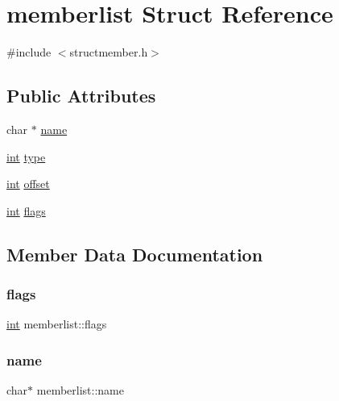 \hypertarget{structmemberlist}{}\section{memberlist Struct Reference}
\label{structmemberlist}


{\ttfamily \#include $<$structmember.\+h$>$}

\subsection*{Public Attributes}
\begin{DoxyCompactItemize}
\item 
char $\ast$ \mbox{\hyperlink{structmemberlist_a75c543af2144964e75d5e3a52e454d68}{name}}
\item 
\mbox{\hyperlink{warnings_8h_a74f207b5aa4ba51c3a2ad59b219a423b}{int}} \mbox{\hyperlink{structmemberlist_a03754cfbc59d653366c4165d2682d485}{type}}
\item 
\mbox{\hyperlink{warnings_8h_a74f207b5aa4ba51c3a2ad59b219a423b}{int}} \mbox{\hyperlink{structmemberlist_a55dfff380cf83407e78a6bb7913f5d7d}{offset}}
\item 
\mbox{\hyperlink{warnings_8h_a74f207b5aa4ba51c3a2ad59b219a423b}{int}} \mbox{\hyperlink{structmemberlist_accf2b50aef69d800ebf983a002a18638}{flags}}
\end{DoxyCompactItemize}


\subsection{Member Data Documentation}
\mbox{\label{structmemberlist_accf2b50aef69d800ebf983a002a18638}} 
\subsubsection{\texorpdfstring{flags}{flags}}
{\footnotesize\ttfamily \mbox{\hyperlink{warnings_8h_a74f207b5aa4ba51c3a2ad59b219a423b}{int}} memberlist\+::flags}

\mbox{\label{structmemberlist_a75c543af2144964e75d5e3a52e454d68}} 
\subsubsection{\texorpdfstring{name}{name}}
{\footnotesize\ttfamily char$\ast$ memberlist\+::name}

